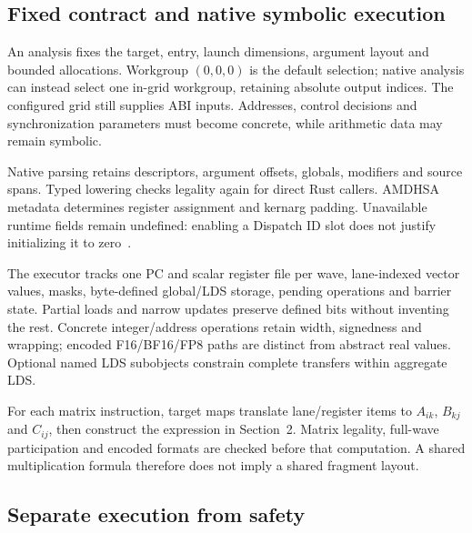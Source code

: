 \documentclass[10pt,letterpaper]{article}
\begin{document}
\subsection{Fixed contract and native symbolic execution}

An analysis fixes the target, entry, launch dimensions, argument layout and
bounded allocations. Workgroup \((0,0,0)\) is the default selection; native
analysis can instead select one in-grid workgroup, retaining absolute output
indices. The configured grid still supplies
ABI inputs. Addresses, control decisions and synchronization
parameters must become concrete, while arithmetic data may remain symbolic.

Native parsing retains descriptors, argument offsets, globals, modifiers and
source spans. Typed lowering checks legality again for direct Rust callers.
AMDHSA metadata determines register assignment and kernarg padding. Unavailable
runtime fields remain undefined: enabling a Dispatch ID slot does not justify
initializing it to zero~\cite{llvmabi}.

The executor tracks one PC and scalar register file per wave, lane-indexed vector
values, masks, byte-defined global/LDS storage, pending operations and barrier
state. Partial loads and narrow updates preserve defined bits without inventing
the rest. Concrete integer/address operations retain width, signedness and
wrapping; encoded F16/BF16/FP8 paths are distinct from abstract real values.
Optional named LDS subobjects constrain complete transfers within aggregate LDS.

For each matrix instruction, target maps translate lane/register items to
\(A_{ik}\), \(B_{kj}\) and \(C_{ij}\), then construct the expression in
Section~2. Matrix legality, full-wave participation and encoded formats are
checked before that computation. A shared multiplication formula therefore does
not imply a shared fragment layout.

\subsection{Separate execution from safety}
\end{document}
